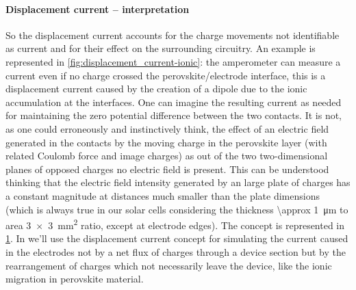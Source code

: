 	\paragraph{Displacement current -- interpretation} So the displacement current accounts for the charge movements not identifiable as current and for their effect on the surrounding circuitry. An example is represented in \cref{fig:displacement_current-ionic}: the amperometer can measure a current even if no charge crossed the perovskite/electrode interface, this is a displacement current caused by the creation of a dipole due to the ionic accumulation at the interfaces. One can imagine the resulting current as needed for maintaining the zero potential difference between the two contacts. It is not, as one could erroneously and instinctively think, the effect of an electric field generated in the contacts by the moving charge in the perovskite layer (with related Coulomb force and image charges) as out of the two two-dimensional planes of opposed charges no electric field is present. This can be understood thinking that the electric field intensity generated by an large plate of charges has a constant magnitude at distances much smaller than the plate dimensions (which is always true in our solar cells considering the thickness \SI{\approx 1}{\um} to area \SI{3x3}{\square\mm} ratio, except at electrode edges). The concept is represented in \cref{fig:dipole_plane}. In  we'll use the displacement current concept for simulating the current caused in the electrodes not by a net flux of charges through a device section but by the rearrangement of charges which not necessarily leave the device, like the ionic migration in perovskite material. 
	
	\begin{figure}
		\label{fig:dipole_plane}
	\end{figure}

